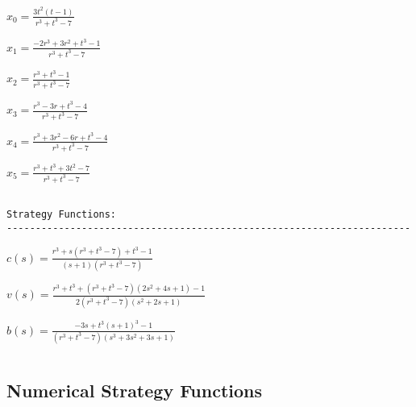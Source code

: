 \documentclass[../../main/main.tex]{subfiles}
\begin{document}
    $\displaystyle x_{0} = \frac{3 t^{2} \left(t - 1\right)}{r^{3} + t^{3} - 7}$

    
    $\displaystyle x_{1} = \frac{- 2 r^{3} + 3 r^{2} + t^{3} - 1}{r^{3} + t^{3} - 7}$

    
    $\displaystyle x_{2} = \frac{r^{3} + t^{3} - 1}{r^{3} + t^{3} - 7}$

    
    $\displaystyle x_{3} = \frac{r^{3} - 3 r + t^{3} - 4}{r^{3} + t^{3} - 7}$

    
    $\displaystyle x_{4} = \frac{r^{3} + 3 r^{2} - 6 r + t^{3} - 4}{r^{3} + t^{3} - 7}$

    
    $\displaystyle x_{5} = \frac{r^{3} + t^{3} + 3 t^{2} - 7}{r^{3} + t^{3} - 7}$

    
    \begin{Verbatim}[commandchars=\\\{\}]

Strategy Functions:
----------------------------------------------------------------------
    \end{Verbatim}

    $\displaystyle c{\left(s \right)} = \frac{r^{3} + s \left(r^{3} + t^{3} - 7\right) + t^{3} - 1}{\left(s + 1\right) \left(r^{3} + t^{3} - 7\right)}$

    
    $\displaystyle v{\left(s \right)} = \frac{r^{3} + t^{3} + \left(r^{3} + t^{3} - 7\right) \left(2 s^{2} + 4 s + 1\right) - 1}{2 \left(r^{3} + t^{3} - 7\right) \left(s^{2} + 2 s + 1\right)}$

    
    $\displaystyle b{\left(s \right)} = \frac{- 3 s + t^{3} \left(s + 1\right)^{3} - 1}{\left(r^{3} + t^{3} - 7\right) \left(s^{3} + 3 s^{2} + 3 s + 1\right)}$

    
    \begin{Verbatim}[commandchars=\\\{\}]

    \end{Verbatim}

    \subsection{Numerical Strategy
Functions}\label{numerical-strategy-functions}
\end{document}

